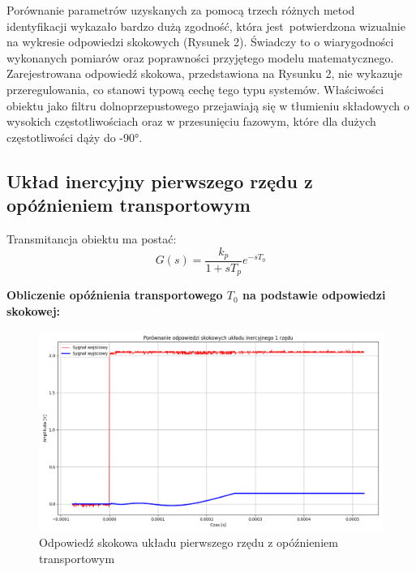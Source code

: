 \documentclass[12pt,a4paper]{article}
\begin{document}
	Porównanie parametrów uzyskanych za pomocą trzech różnych metod identyfikacji wykazało bardzo dużą zgodność, która jest potwierdzona wizualnie na wykresie odpowiedzi skokowych (Rysunek 2). Świadczy to o wiarygodności wykonanych pomiarów oraz poprawności przyjętego modelu matematycznego. Zarejestrowana odpowiedź skokowa, przedstawiona na Rysunku 2, nie wykazuje przeregulowania, co stanowi typową cechę tego typu systemów. Właściwości obiektu jako filtru dolnoprzepustowego przejawiają się w tłumieniu składowych o wysokich częstotliwościach oraz w przesunięciu fazowym, które dla dużych częstotliwości dąży do -90°.
	
	\subsection{Układ inercyjny pierwszego rzędu z opóźnieniem transportowym}
	
	Transmitancja obiektu ma postać:
	\begin{equation}
		G(s) = \frac{k_p}{1 + sT_p} e^{-sT_0}
	\end{equation}
		
	
	\noindent \textbf{Obliczenie opóźnienia transportowego $T_0$ na podstawie odpowiedzi skokowej:}
	\begin{figure}[H]
		\centering
		\includegraphics[width=1\linewidth]{zdjecia/odp_skok_z_opz.png}
		\caption{Odpowiedź skokowa układu pierwszego rzędu z opóźnieniem transportowym}
		\label{fig:odp_skok_z_opz}
	\end{figure}
		
\end{document}
